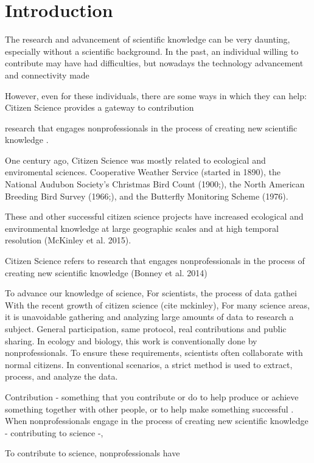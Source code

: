 \chapter*[Introduction]{Introduction}

The research and advancement of scientific knowledge can be very daunting, especially without a scientific background. In the past, an individual willing to contribute may have had difficulties, but nowadays the technology advancement and connectivity made

However, even for these individuals, there are some ways in which they can help: Citizen Science provides a gateway to contribution

research that engages nonprofessionals in the process of creating new scientific knowledge \cite{asd}.

One century ago, Citizen Science was mostly related to ecological and enviromental sciences. Cooperative Weather Service (started in 1890), the National Audubon Society’s Christmas Bird Count (1900;), the North American Breeding Bird Survey (1966;), and the Butterfly Monitoring Scheme (1976).

These and other successful citizen science projects have increased ecological and environmental knowledge at large geographic scales and at high temporal resolution (McKinley et al. 2015).

Citizen Science refers to research that engages nonprofessionals in the process of creating new scientific knowledge (Bonney et al. 2014)

To advance our knowledge of science, 
For scientists, the process of data gathei
With the recent growth of citizen science (cite mckinley), 
For many science areas, it is unavoidable gathering and analyzing large amounts of data to research a subject. 
General participation, same protocol, real contributions and public sharing.
In ecology and biology, this work is conventionally done by nonprofessionals.
To ensure these requirements, scientists often collaborate with normal citizens.
In conventional scenarios, a strict method is used to extract, process, and analyze the data.

Contribution - something that you contribute or do to help produce or achieve something together with other people, or to help make something successful \cite{TCDP2020}. 
When nonprofessionals engage in the process of creating new scientific knowledge - contributing to science -, 

To contribute to science, nonprofessionals have 

